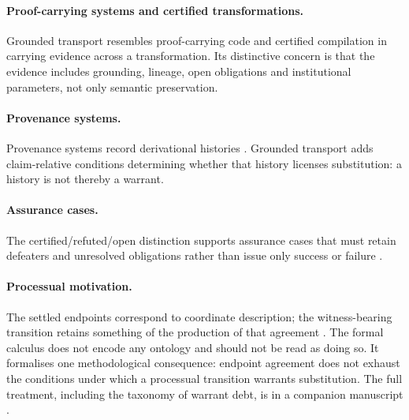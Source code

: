 \paragraph{Proof-carrying systems and certified transformations.}
Grounded transport resembles proof-carrying code \cite{necula1997} and certified compilation \cite{leroy2009} in carrying evidence across a transformation. Its distinctive concern is that the evidence includes grounding, lineage, open obligations and institutional parameters, not only semantic preservation.

\paragraph{Provenance systems.}
Provenance systems record derivational histories \cite{buneman2001,cheney2009}. Grounded transport adds claim-relative conditions determining whether that history licenses substitution: a history is not thereby a warrant.

\paragraph{Assurance cases.}
The certified/refuted/open distinction supports assurance cases that must retain defeaters and unresolved obligations rather than issue only success or failure \cite{bloomfield2020}.

\paragraph{Processual motivation.}
The settled endpoints correspond to coordinate description; the witness-bearing transition retains something of the production of that agreement \cite{whitehead1929}. The formal calculus does not encode any ontology and should not be read as doing so. It formalises one methodological consequence: endpoint agreement does not exhaust the conditions under which a processual transition warrants substitution. The full treatment, including the taxonomy of warrant debt, is in a companion manuscript \cite{companion}.


